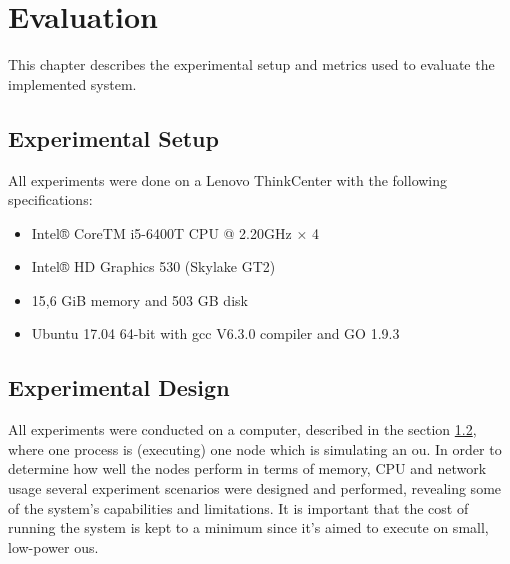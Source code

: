 \documentclass[USenglish]{uit-thesis}
\begin{document}




\chapter{Evaluation}
This chapter describes the experimental setup and metrics used to evaluate the implemented system.

\section{Experimental Setup}
All experiments were done on a Lenovo ThinkCenter with the following specifications:

\begin{itemize} 
\item Intel® CoreTM i5-6400T CPU @ 2.20GHz × 4
\item Intel® HD Graphics 530 (Skylake GT2)
\item 15,6 GiB memory and 503 GB disk
\item Ubuntu 17.04 64-bit with gcc V6.3.0 compiler and GO 1.9.3
\end{itemize}


\section{Experimental Design} \label{eva:exp_des}



All experiments were conducted on a computer, described in the section \ref{eva:exp_des}, where one process is (executing) one node which is simulating an \gls{ou}. In order to determine how well the nodes perform in terms of memory, CPU and network usage several experiment scenarios were designed and performed, revealing some of the system's capabilities and limitations. It is important that the cost of running the system is kept to a minimum since it's aimed to execute on small, low-power \gls{ou}s.
\end{document}
